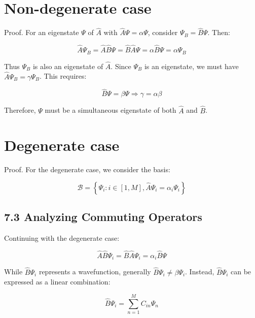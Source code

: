 \documentclass[italian]{HKNdocument}
\begin{document}
\section*{Non-degenerate case}
Proof. For an eigenstate $\Psi$ of $\hat{A}$ with $\hat{A} \Psi=\alpha \Psi$, consider $\Psi_{B}=\hat{B} \Psi$. Then:

\begin{equation*}
\hat{A} \Psi_{B}=\hat{A} \hat{B} \Psi=\hat{B} \hat{A} \Psi=\alpha \hat{B} \Psi=\alpha \Psi_{B} \tag{7.23}
\end{equation*}

Thus $\Psi_{B}$ is also an eigenstate of $\hat{A}$. Since $\Psi_B$ is an eigenstate, we must have $\hat{A} \Psi_{B}=\gamma \Psi_{B}$. This requires:

\begin{equation*}
\hat{B} \Psi=\beta \Psi \Longrightarrow \gamma=\alpha \beta \tag{7.24}
\end{equation*}

Therefore, $\Psi$ must be a simultaneous eigenstate of both $\hat{A}$ and $\hat{B}$.

\section*{Degenerate case}
Proof. For the degenerate case, we consider the basis:

\begin{equation*}
\mathcal{B}=\left\{\Psi_{i}: i \in[1, M], \hat{A} \Psi_{i}=\alpha_{i} \Psi_{i}\right\} \tag{7.25}
\end{equation*}


\subsection*{7.3 Analyzing Commuting Operators}
Continuing with the degenerate case:

\begin{equation*}
\hat{A} \hat{B} \Psi_{i}=\hat{B} \hat{A} \Psi_{i}=\alpha_{i} \hat{B} \Psi \tag{7.26}
\end{equation*}

While $\hat{B} \Psi_{i}$ represents a wavefunction, generally $\hat{B} \Psi_{i} \neq \beta \Psi_{i}$. Instead, $\hat{B} \Psi_{i}$ can be expressed as a linear combination:

\begin{equation*}
\hat{B} \Psi_{i}=\sum_{n=1}^{M} C_{i n} \Psi_{n} \tag{7.27}
\end{equation*}
\end{document}
